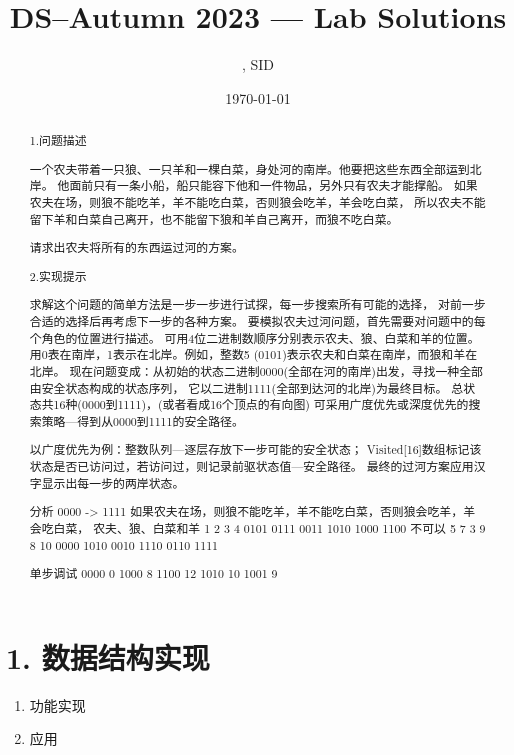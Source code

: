 \documentclass[UTF8]{ctexart}
\title{DS--Autumn 2023 --- Lab \Lab    Solutions} %
\author{\Name, SID \SID} %
\date{\today} %
\newenvironment{qparts}{\begin{enumerate}[{(}a{)}]}{\end{enumerate}} %
\begin{document}
\maketitle


\begin{abstract}

    1.问题描述

    一个农夫带着一只狼、一只羊和一棵白菜，身处河的南岸。他要把这些东西全部运到北岸。
    他面前只有一条小船，船只能容下他和一件物品，另外只有农夫才能撑船。
    如果农夫在场，则狼不能吃羊，羊不能吃白菜，否则狼会吃羊，羊会吃白菜，
    所以农夫不能留下羊和白菜自己离开，也不能留下狼和羊自己离开，而狼不吃白菜。

    请求出农夫将所有的东西运过河的方案。

    2.实现提示

    求解这个问题的简单方法是一步一步进行试探，每一步搜索所有可能的选择，
    对前一步合适的选择后再考虑下一步的各种方案。
    要模拟农夫过河问题，首先需要对问题中的每个角色的位置进行描述。
    可用4位二进制数顺序分别表示农夫、狼、白菜和羊的位置。
    用0表在南岸，1表示在北岸。例如，整数5 (0101)表示农夫和白菜在南岸，而狼和羊在北岸。
    现在问题变成：从初始的状态二进制0000(全部在河的南岸)出发，寻找一种全部由安全状态构成的状态序列，
    它以二进制1111(全部到达河的北岸)为最终目标。
    总状态共16种(0000到1111)，(或者看成16个顶点的有向图)
    可采用广度优先或深度优先的搜索策略---得到从0000到1111的安全路径。

    以广度优先为例：整数队列---逐层存放下一步可能的安全状态；
    Visited[16]数组标记该状态是否已访问过，若访问过，则记录前驱状态值---安全路径。
    最终的过河方案应用汉字显示出每一步的两岸状态。


    分析
    0000 -> 1111
    如果农夫在场，则狼不能吃羊，羊不能吃白菜，否则狼会吃羊，羊会吃白菜，
    农夫、狼、白菜和羊
    1     2  3     4
    0101 0111 0011 
    1010 1000 1100 不可以
    5  7  3 
    9  8  10
    0000
    1010
    0010
    1110
    0110
    1111


    单步调试
    0000  0
    1000  8
    1100  12
    1010  10
    1001  9




\end{abstract}







\section*{1. 数据结构实现}
\begin{qparts}
    \item 功能实现


    \item 应用 
    
\end{qparts}
\end{document}
